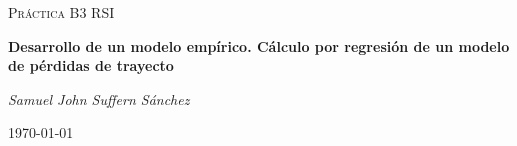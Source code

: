 \documentclass{article}
\begin{document}
\begin{titlepage}
\centering
{\scshape\LARGE Práctica B3 RSI\par}
	\vspace{1cm}
	\vspace{1.5cm}
	{\huge\bfseries Desarrollo de un modelo empírico.
Cálculo por regresión de un modelo de pérdidas de trayecto \par}
	\vspace{2cm}
	{\Large\itshape Samuel John Suffern Sánchez\par}
	\vfill
	\vfill
	{\large \today\par}
\end{titlepage}


\tableofcontents
\listoffigures
\pagebreak
\end{document}
